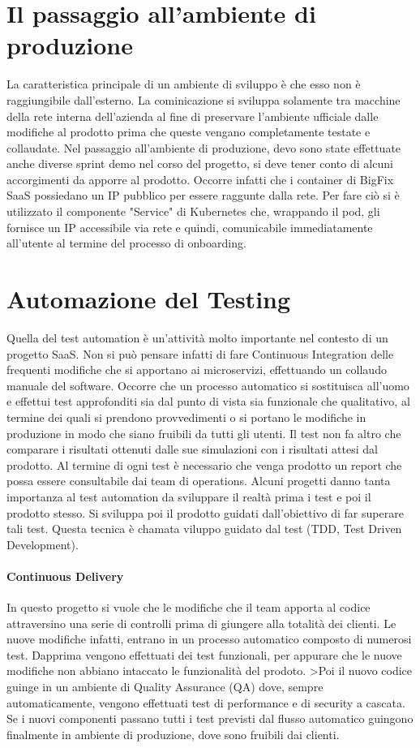 \section{Il passaggio all'ambiente di produzione}
La caratteristica principale di un ambiente di sviluppo è che esso non è raggiungibile dall'esterno. La cominicazione si sviluppa solamente tra macchine della rete interna dell'azienda al fine di preservare l'ambiente ufficiale dalle modifiche al prodotto prima che queste vengano completamente testate e collaudate. Nel passaggio all'ambiente di produzione, devo sono state effettuate anche diverse sprint demo nel corso del progetto, si deve tener conto di alcuni accorgimenti da apporre al prodotto. Occorre infatti che i container di BigFix SaaS possiedano un IP pubblico per essere raggunte dalla rete. Per fare ciò si è utilizzato il componente "Service" di Kubernetes che, wrappando il pod, gli fornisce un IP accessibile via rete e quindi, comunicabile immediatamente all'utente al termine del processo di onboarding.

\section{Automazione del Testing}
Quella del test automation è un'attività molto importante nel contesto di un progetto SaaS. Non si può pensare infatti di fare Continuous Integration delle frequenti modifiche che si apportano ai microservizi, effettuando un collaudo manuale del software. Occorre che un processo automatico si sostituisca all'uomo e effettui test approfonditi sia dal punto di vista sia funzionale che qualitativo, al termine dei quali si prendono provvedimenti o si portano le modifiche in produzione in modo che siano fruibili da tutti gli utenti. Il test non fa altro che comparare i risultati ottenuti dalle sue simulazioni con i risultati attesi dal prodotto. Al termine di ogni test è necessario che venga prodotto un report che possa essere consultabile dai team di operations. Alcuni progetti danno tanta importanza al test automation da sviluppare il realtà prima i test e poi il prodotto stesso. Si sviluppa poi il prodotto guidati dall'obiettivo di far superare tali test. Questa tecnica è chamata viluppo guidato dal test (TDD, Test Driven Development).
\paragraph{Continuous Delivery}
In questo progetto si vuole che le modifiche che il team apporta al codice attraversino una serie di controlli prima di giungere alla totalità dei clienti. Le nuove modifiche infatti, entrano in un processo automatico composto di numerosi test. Dapprima vengono effettuati dei test funzionali, per appurare che le nuove modifiche non abbiano intaccato le funzionalità del prodoto. >Poi il nuovo codice guinge in un ambiente di Quality Assurance (QA) dove, sempre automaticamente, vengono effettuati test di performance e di security a cascata. Se i nuovi componenti passano tutti i test previsti dal flusso automatico guingono finalmente in ambiente di produzione, dove sono fruibili dai clienti. 
